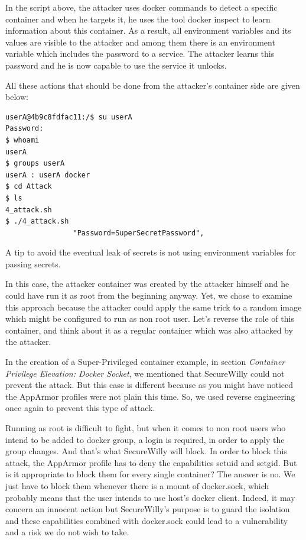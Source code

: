 In the script above, the attacker uses docker commands to detect a specific container and when he targets it, he uses the tool docker inspect to learn information about this container. As a result, all environment variables and its values are visible to the attacker and among them there is an environment variable which includes the password to a service. The attacker learns this password and he is now capable to use the service it unlocks.

All these actions that should be done from the attacker's container side are given below:

\begin{lstlisting}[style=terminal]
userA@4b9c8fdfac11:/$ su userA
Password:
$ whoami
userA
$ groups userA
userA : userA docker
$ cd Attack
$ ls
4_attack.sh
$ ./4_attack.sh
                "Password=SuperSecretPassword",
\end{lstlisting}

A tip to avoid the eventual leak of secrets is not using environment variables for passing secrets.

In this case, the attacker container was created by the attacker himself and he could have run it as root from the beginning anyway. Yet, we chose to examine this approach because the attacker could apply the same trick to a random image which might be configured to run as non root user. Let's reverse the role of this container, and think about it as a regular container which was also attacked by the attacker.

In the creation of a Super-Privileged container example, in section \textit{Container Privilege Elevation: Docker Socket}, we mentioned that SecureWilly could not prevent the attack.  But this case is different because as you might have noticed the AppArmor profiles were not plain this time. So, we used reverse engineering once again to prevent this type of attack.

Running as root is difficult to fight, but when it comes to non root users who intend to be added to docker group, a login is required, in order to apply the group changes. And that's what SecureWilly will block. In order to block this attack, the AppArmor profile has to deny the capabilities setuid and setgid. But is it appropriate to block them for every single container? The answer is no. We just have to block them whenever there is a mount of docker.sock, which probably means that the user intends to use host's docker client. Indeed, it may concern an innocent action but SecureWilly's purpose is to guard the isolation and these capabilities combined with docker.sock could lead to a vulnerability and a risk we do not wish to take.

